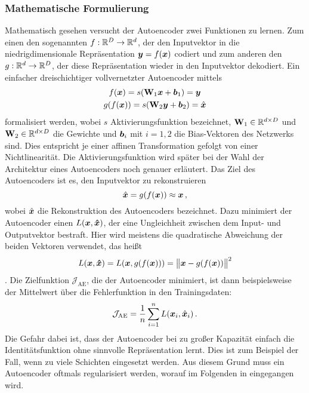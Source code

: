 \subsubsection{Mathematische Formulierung}
\label{ch:MethodenDerDimRed:ML:AE:MathematischeFormulierung}
Mathematisch gesehen versucht der Autoencoder zwei Funktionen zu lernen. Zum einen den sogenannten  $f: \mathbb{R}^D \rightarrow \mathbb{R}^d$, der den Inputvektor in die niedrigdimensionale Repräsentation $\bm{y} = f(\bm{x})$ codiert und zum anderen den  $g: \mathbb{R}^d \rightarrow \mathbb{R}^D$, der diese Repräsentation wieder in den Inputvektor dekodiert. Ein einfacher dreischichtiger vollvernetzter Autoencoder mittels
\begin{gather}
	\label{eq:dreischichtigerAE}
	f(\vect{x}) = s(\mat{W}_1 \vect{x} + \vect{b}_1) = \vect{y} \\
	g(f(\vect{x})) = s(\mat{W}_2 \vect{y} + \vect{b}_2) = \estNormal{\vect{x}}
\end{gather}
formalisiert werden, wobei $s$ Aktivierungsfunktion bezeichnet, $\mathbf{W}_1 \in \mathbb{R}^{d \times D}$ und $\mathbf{W}_2 \in \mathbb{R}^{d \times D}$ die Gewichte und $\bm{b}_i$ mit $i = 1,2$ die Bias-Vektoren des Netzwerks sind. Dies entspricht je einer affinen Transformation gefolgt von einer Nichtlinearität. Die Aktivierungsfunktion wird später bei der Wahl der Architektur eines Autoencoders noch genauer erläutert.
Das Ziel des Autoencoders ist es, den Inputvektor zu rekonstruieren
\begin{equation}
	\hat{\bm{x}} = g(f(\bm{x})) \approx \bm{x} \, ,
\end{equation}
wobei $\hat{\bm{x}}$ die Rekonstruktion des Autoencoders bezeichnet.
Dazu minimiert der Autoencoder einen  $L(\bm{x}, \bm{\hat{x}})$, der eine Ungleichheit zwischen dem Input- und Outputvektor bestraft. Hier wird meistens die quadratische Abweichung der beiden Vektoren verwendet, das heißt
\begin{equation}
	\label{eq:MSE_loss}
	L(\vect{x}, \vect{\estNormal{x}}) = L(\vect{x}, g(f(\vect{x}))) = \norm[\big]{\vect{x} - g(f(\vect{x}))}^2
\end{equation}
\parencite[507]{Goodfellow.2016}. Die Zielfunktion $\mathcal{J}_{\text{AE}}$, die der Autoencoder
minimiert, ist dann beispielsweise der Mittelwert über die Fehlerfunktion in den Trainingsdaten:
\begin{equation}
	\label{eq:AE_objectiveFunction}
	\mathcal{J}_{\text{AE}} = \frac{1}{n} \sum_{i = 1}^n L(\vect{x}_i, \estNormal{\vect{x}}_i) \, .
\end{equation}
Die Gefahr dabei ist, dass der Autoencoder bei zu großer Kapazität einfach die Identitätsfunktion
ohne sinnvolle Repräsentation lernt. Dies ist zum Beispiel der Fall, wenn zu viele Schichten
eingesetzt werden. Aus diesem
Grund muss ein Autoencoder oftmals regularisiert werden, worauf im Folgenden in
 eingegangen wird.

